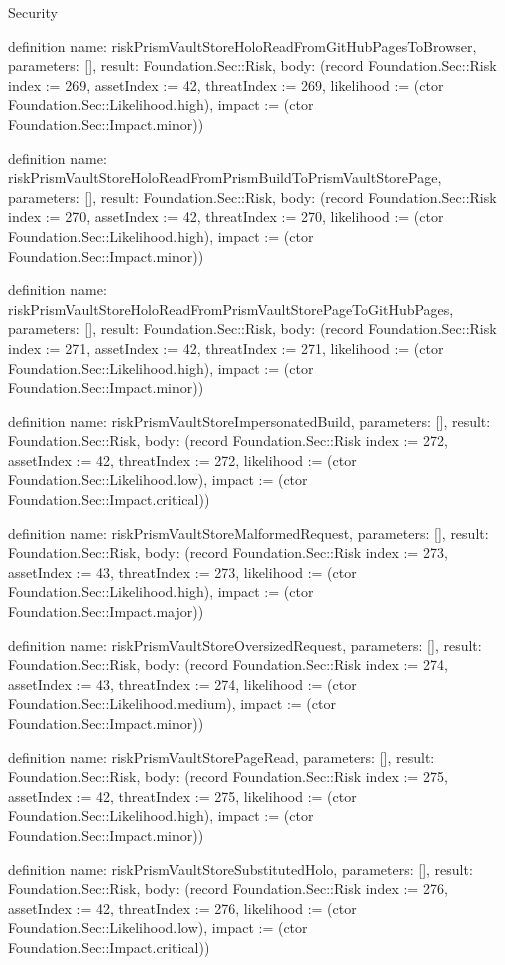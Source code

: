 \begin{lexlean}{Security}
\begin{semanticmodule}
definition{
  name: riskPrismVaultStoreHoloReadFromGitHubPagesToBrowser,
  parameters: [],
  result: Foundation.Sec::Risk,
  body: (record Foundation.Sec::Risk {index := 269, assetIndex := 42, threatIndex := 269, likelihood := (ctor Foundation.Sec::Likelihood.high), impact := (ctor Foundation.Sec::Impact.minor)})
}

definition{
  name: riskPrismVaultStoreHoloReadFromPrismBuildToPrismVaultStorePage,
  parameters: [],
  result: Foundation.Sec::Risk,
  body: (record Foundation.Sec::Risk {index := 270, assetIndex := 42, threatIndex := 270, likelihood := (ctor Foundation.Sec::Likelihood.high), impact := (ctor Foundation.Sec::Impact.minor)})
}

definition{
  name: riskPrismVaultStoreHoloReadFromPrismVaultStorePageToGitHubPages,
  parameters: [],
  result: Foundation.Sec::Risk,
  body: (record Foundation.Sec::Risk {index := 271, assetIndex := 42, threatIndex := 271, likelihood := (ctor Foundation.Sec::Likelihood.high), impact := (ctor Foundation.Sec::Impact.minor)})
}

definition{
  name: riskPrismVaultStoreImpersonatedBuild,
  parameters: [],
  result: Foundation.Sec::Risk,
  body: (record Foundation.Sec::Risk {index := 272, assetIndex := 42, threatIndex := 272, likelihood := (ctor Foundation.Sec::Likelihood.low), impact := (ctor Foundation.Sec::Impact.critical)})
}

definition{
  name: riskPrismVaultStoreMalformedRequest,
  parameters: [],
  result: Foundation.Sec::Risk,
  body: (record Foundation.Sec::Risk {index := 273, assetIndex := 43, threatIndex := 273, likelihood := (ctor Foundation.Sec::Likelihood.high), impact := (ctor Foundation.Sec::Impact.major)})
}

definition{
  name: riskPrismVaultStoreOversizedRequest,
  parameters: [],
  result: Foundation.Sec::Risk,
  body: (record Foundation.Sec::Risk {index := 274, assetIndex := 43, threatIndex := 274, likelihood := (ctor Foundation.Sec::Likelihood.medium), impact := (ctor Foundation.Sec::Impact.minor)})
}

definition{
  name: riskPrismVaultStorePageRead,
  parameters: [],
  result: Foundation.Sec::Risk,
  body: (record Foundation.Sec::Risk {index := 275, assetIndex := 42, threatIndex := 275, likelihood := (ctor Foundation.Sec::Likelihood.high), impact := (ctor Foundation.Sec::Impact.minor)})
}

definition{
  name: riskPrismVaultStoreSubstitutedHolo,
  parameters: [],
  result: Foundation.Sec::Risk,
  body: (record Foundation.Sec::Risk {index := 276, assetIndex := 42, threatIndex := 276, likelihood := (ctor Foundation.Sec::Likelihood.low), impact := (ctor Foundation.Sec::Impact.critical)})
}


\end{semanticmodule}
\end{lexlean}
